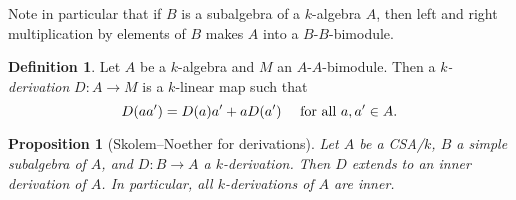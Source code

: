 \documentclass[11pt]{amsart}
\numberwithin{equation}{section}
\newtheorem{proposition}[equation]{Proposition}
\theoremstyle{remark}
\theoremstyle{remark}
\theoremstyle{remark}
\theoremstyle{definition}
\theoremstyle{definition}
\theoremstyle{definition}
\newtheorem{defi}[equation]{Definition}
\theoremstyle{definition}
\theoremstyle{definition}
\theoremstyle{definition}
\begin{document}
Note in particular that if $B$ is a subalgebra of a $k$-algebra $A$, then left and right multiplication by elements of $B$ makes $A$ into a $B$-$B$-bimodule. 

\begin{defi}
Let $A$ be a $k$-algebra and $M$ an $A$-$A$-bimodule. Then a $k$\textit{-derivation} $D:A\rightarrow M$ is a $k$-linear map such that 
\[D(aa')=D(a)a'+aD(a')~~~\textup{ for all }a,a'\in A.\]
\end{defi}

\begin{proposition}[Skolem--Noether for derivations]
Let $A$ be a CSA/$k$, $B$ a simple subalgebra of $A$, and $D:B\rightarrow A$ a $k$-derivation. Then $D$ extends to an inner derivation of $A$. In particular, all $k$-derivations of $A$ are inner.
\end{proposition}
\end{document}
